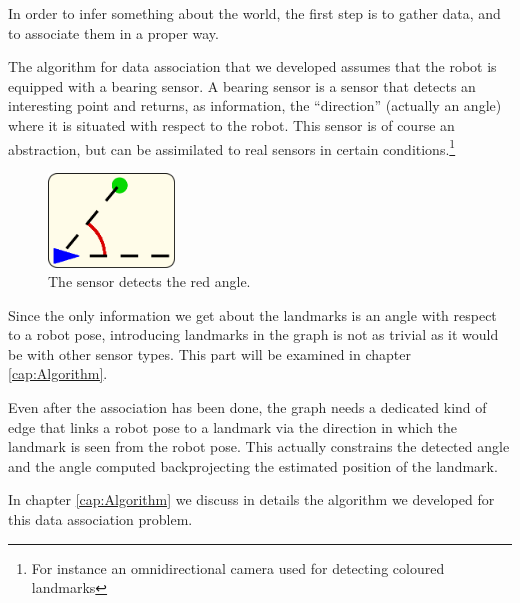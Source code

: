 In order to infer something about the world, the first step is to gather data, and to associate them in a proper way.

The algorithm for data association that we developed assumes that the robot is equipped with a bearing sensor. A bearing sensor is a sensor that detects an interesting point and returns, as information, the ``direction'' (actually an angle) where it is situated with respect to the robot.
This sensor is of course an abstraction, but can be assimilated to real sensors in certain conditions.\footnote{For instance an omnidirectional camera used for detecting coloured landmarks}

\begin{figure}[htbp]
  \centering
    \includegraphics[width=0.3\textwidth]{images/bearing_sensor.png}
  \caption{The sensor detects the red angle.}
  \label{fig:bearing_sensor}
\end{figure}

Since the only information we get about the landmarks is an angle with respect to a robot pose, introducing landmarks in the graph is not as trivial as it would be with other sensor types. This part will be examined in chapter \ref{cap:Algorithm}.

Even after the association has been done, the graph needs a dedicated kind of edge that links a robot pose to a landmark via the direction in which the landmark is seen from the robot pose. This actually constrains the detected angle and the angle computed backprojecting the estimated position of the landmark.

In chapter \ref{cap:Algorithm} we discuss in details the algorithm we developed for this data association problem.
